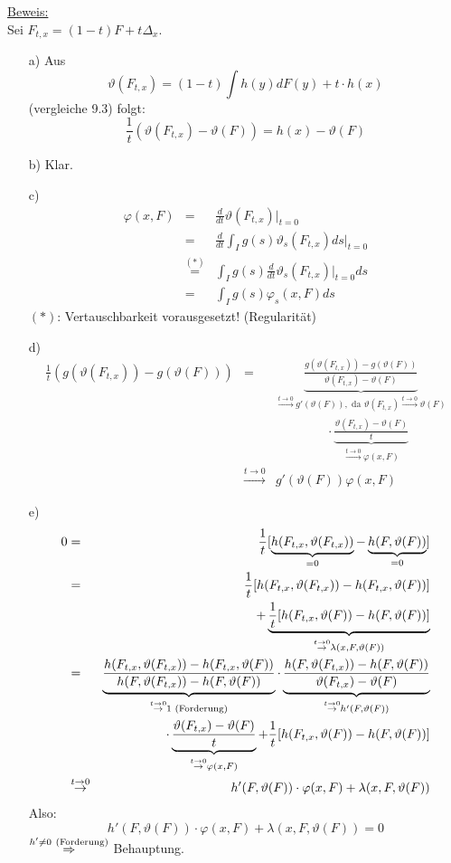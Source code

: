 \documentclass[a4paper,11pt,twoside,titlepage]{article}
\begin{document}
\underline{Beweis:}\\ 
Sei $F_{t,x}=(1-t)F+t\Delta_x$.
\begin{itemize}
\item[a)] Aus
\[\vartheta(F_{t,x})=(1-t)\int h(y)dF(y)+t\cdot h(x)\]
(vergleiche 9.3) folgt:
\[\frac1t(\vartheta(F_{t,x})-\vartheta(F))=h(x)-\vartheta(F)\]
\item[b)] Klar.
\item[c)]
\begin{eqnarray*}
\varphi(x,F)&=&\frac{d}{dt}\vartheta(F_{t,x})|_{t=0}\\
&=&\frac{d}{dt}\int_I g(s)\vartheta_s(F_{t,x})ds|_{t=0}\\
&\stackrel{(\ast)}{=}&\int_I g(s)\frac{d}{dt}\vartheta_s(F_{t,x})|_{t=0}ds\\
&=&\int_I g(s)\varphi_s(x,F)ds\end{eqnarray*}
$(\ast)$: Vertauschbarkeit vorausgesetzt! (Regularität)
\item[d)] \begin{eqnarray*}
\frac1t(g(\vartheta(F_{t,x}))-g(\vartheta(F)))&=&\underbrace{\frac{g(\vartheta(F_{t,x}))-g(\vartheta(F))}{\vartheta(F_{t,x})-\vartheta(F)}}_{\stackrel{t\to0}{\to}g'(\vartheta(F)),\mbox{ da }\vartheta(F_{t,x})\stackrel{t\to0}{\to}\vartheta(F)}\\&&\qquad\qquad\cdot\underbrace{\frac{\vartheta(F_{t,x})-\vartheta(F)}{t}}_{\stackrel{t\to0}{\to}\varphi(x,F)}\\
&\stackrel{t\to0}{\to}&g'(\vartheta(F))\varphi(x,F)\end{eqnarray*}
\item[e)] \begin{eqnarray*}
0&=&\frac1t[\underbrace{h(F_{t,x},\vartheta(F_{t,x}))}_{=0}-\underbrace{h(F,\vartheta(F))}_{=0}]\\&=&\frac1t[h(F_{t,x},\vartheta(F_{t,x}))-h(F_{t,x},\vartheta(F))]\\&&\qquad\qquad+\underbrace{\frac1t[h(F_{t,x},\vartheta(F))-h(F,\vartheta(F))]}_{\stackrel{t\to0}{\to}\lambda(x,F,\vartheta(F))}\\
&=&\underbrace{\frac{h(F_{t,x},\vartheta(F_{t,x}))-h(F_{t,x},\vartheta(F))}{h(F,\vartheta(F_{t,x}))-h(F,\vartheta(F))}}_{\stackrel{t\to0}{\to}1\textnormal{ (Forderung)}}\cdot\underbrace{\frac{h(F,\vartheta(F_{t,x}))-h(F,\vartheta(F))}{\vartheta(F_{t,x})-\vartheta(F)}}_{\stackrel{t\to0}{\to}h'(F,\vartheta(F))}\\&&\qquad\qquad\cdot\underbrace{\frac{\vartheta(F_{t,x})-\vartheta(F)}{t}}_{\stackrel{t\to0}{\to}\varphi(x,F)}+\frac1t[h(F_{t,x},\vartheta(F))-h(F,\vartheta(F))]\\
&\stackrel{t\to0}{\to}&h'(F,\vartheta(F))\cdot\varphi(x,F)+\lambda(x,F,\vartheta(F))\end{eqnarray*}
Also:
\[h'(F,\vartheta(F))\cdot\varphi(x,F)+\lambda(x,F,\vartheta(F))=0\]
$\stackrel{h'\neq0\ \textnormal{(Forderung)}}{\Rightarrow}$ Behauptung.
\end{itemize}
\end{document}
